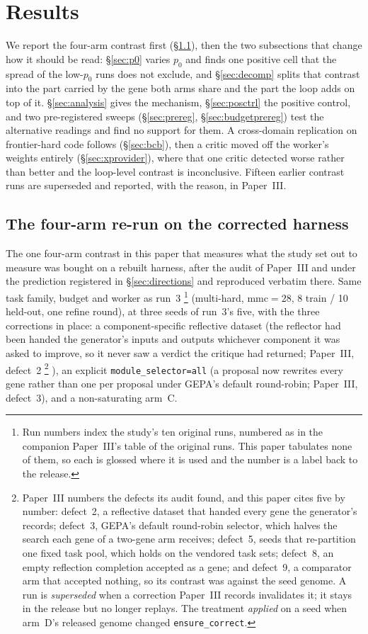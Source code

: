 \documentclass[11pt]{article}
\begin{document}
\section{Results}
\label{sec:results}

We report the four-arm contrast first (\S\ref{sec:rerun}), then the two subsections that change
how it should be read: \S\ref{sec:p0} varies $p_0$ and finds one positive cell that the spread
of the low-$p_0$ runs does not exclude, and \S\ref{sec:decomp} splits that contrast into the part
carried by the gene both arms share and the part the loop adds on top of it.
\S\ref{sec:analysis} gives the mechanism, \S\ref{sec:posctrl} the positive control, and two
pre-registered sweeps (\S\ref{sec:prereg}, \S\ref{sec:budgetprereg}) test the alternative
readings and find no support for them. A cross-domain replication on frontier-hard code follows
(\S\ref{sec:bcb}), then a critic moved off the worker's weights entirely (\S\ref{sec:xprovider}),
where that one critic detected worse rather than better and the loop-level contrast is
inconclusive. Fifteen earlier contrast runs are superseded and reported, with the reason, in
Paper~III.

\subsection{The four-arm re-run on the corrected harness}
\label{sec:rerun}

The one four-arm contrast in this paper that measures what the study set out to measure was bought on a rebuilt harness, after the audit of Paper~III and under the prediction registered in \S\ref{sec:directions} and reproduced verbatim there. Same task family, budget and worker as run~3%
\footnote{Run numbers index the study's ten original runs, numbered as in the companion
Paper~III's table of the original runs. This paper tabulates none of them, so each is
glossed where it is used and the number is a label back to the release.}
(multi-hard, $\mathrm{mmc}=28$, 8 train / 10 held-out, one refine round), at three seeds of
run~3's five, with the three corrections in place: a component-specific reflective dataset (the reflector had
been handed the generator's inputs and outputs whichever component it was asked to improve,
so it never saw a verdict the critique had returned; Paper~III, defect~2%
\footnote{Paper~III numbers the defects its audit found, and this paper cites five by number:
defect~2, a reflective dataset that handed every gene the generator's records; defect~3, GEPA's
default round-robin selector, which halves the search each gene of a two-gene arm receives;
defect~5, seeds that re-partition one fixed task pool, which holds on the vendored task sets;
defect~8, an empty reflection completion accepted as a gene; and defect~9, a comparator arm that
accepted nothing, so its contrast was against the seed genome. A run is \emph{superseded} when a
correction Paper~III records invalidates it; it stays in the release but no longer replays. The
treatment \emph{applied} on a seed when arm~D's released genome changed \texttt{ensure\_correct}.}%
), an explicit
\texttt{module\_selector=all} (a proposal now rewrites every gene rather than one per
proposal under GEPA's default round-robin; Paper~III, defect~3), and a non-saturating
arm~C.
\end{document}
